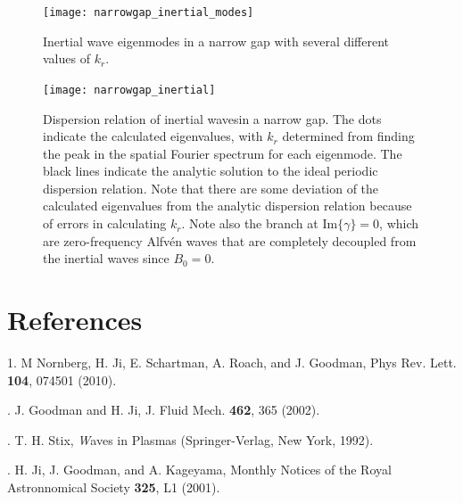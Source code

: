 \documentclass[letterpaper]{article}
\begin{document}
\begin{figure}
\centering
\texttt{[image: narrowgap\_inertial\_modes]}
\caption[Inertial wave eigenmodes in a narrow gap]{Inertial wave
  eigenmodes in a narrow gap with several different values of
  $k_r$.}
\label{fig:globalcode:narrowgap_inertial_modes}
\end{figure}


\begin{figure}
\centering
\texttt{[image: narrowgap\_inertial]}
\caption[Dispersion relation of inertial wavesgap]{Dispersion relation
  of inertial wavesin a narrow gap. The dots indicate the calculated
  eigenvalues, with $k_r$ determined from finding the peak in the
  spatial Fourier spectrum for each eigenmode. The black lines
  indicate the analytic solution to the ideal periodic dispersion
  relation. Note that there are some deviation of the calculated
  eigenvalues from the analytic dispersion relation because of errors
  in calculating $k_r$. Note also the branch at
  $\mathrm{Im}\{\gamma\}=0$, which are zero-frequency Alfv\'en waves
  that are completely decoupled from the inertial waves since
  $B_0=0$.}
\label{fig:globalcode:narrowgap_inertial}
\end{figure}



\section{References}
1. M Nornberg, H. Ji, E. Schartman, A. Roach, and J. Goodman, Phys
Rev. Lett. {\bf 104}, 074501 (2010).

. J. Goodman and H. Ji, J. Fluid Mech. {\bf 462}, 365 (2002).

. T. H. Stix, {\emph Waves in Plasmas} (Springer-Verlag,
New York, 1992).

. H. Ji, J. Goodman, and A. Kageyama, Monthly Notices of
the Royal Astronnomical Society {\bf 325}, L1 (2001).
\end{document}
